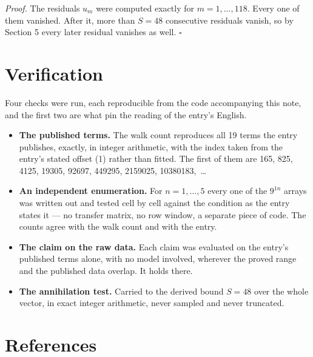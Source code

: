 \documentclass[11pt]{article}
\theoremstyle{definition}
\begin{document}
{\itshape Proof.} The residuals $u_m$ were computed exactly for $m = 1,\dots,118$. Every one of them vanished. After it, more than $S = 48$ consecutive residuals vanish, so by Section 5 every later residual vanishes as well. $\square$

\section{Verification}

Four checks were run, each reproducible from the code accompanying this note, and the first two are what pin the reading of the entry's English.

\begin{itemize}

\item {\bfseries The published terms.} The walk count reproduces all 19 terms the entry publishes, exactly, in integer arithmetic, with the index taken from the entry's stated offset (1) rather than fitted. The first of them are 165, 825, 4125, 19305, 92697, 449295, 2159025, 10380183,~\dots

\item {\bfseries An independent enumeration.} For $n = 1,\dots,5$ every one of the $9^{1n}$ arrays was written out and tested cell by cell against the condition as the entry states it --- no transfer matrix, no row window, a separate piece of code. The counts agree with the walk count and with the entry.

\item {\bfseries The claim on the raw data.} Each claim was evaluated on the entry's published terms alone, with no model involved, wherever the proved range and the published data overlap. It holds there.

\item {\bfseries The annihilation test.} Carried to the derived bound $S = 48$ over the whole vector, in exact integer arithmetic, never sampled and never truncated.

\end{itemize}

\section{References}
\end{document}
